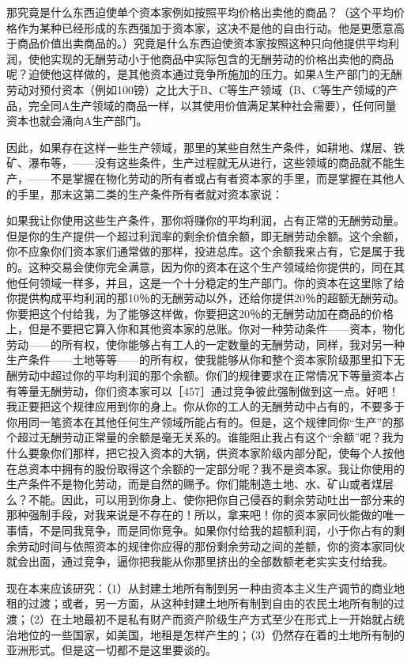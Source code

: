 那究竟是什么东西迫使单个资本家例如按照平均价格出卖他的商品？（这个平均价格作为某种已经形成的东西强加于资本家，这决不是他的自由行动。他是更愿意高于商品价值出卖商品的。）究竟是什么东西迫使资本家按照这种只向他提供平均利润，使他实现的无酬劳动小于他商品中实际包含的无酬劳动的价格出卖他的商品呢？迫使他这样做的，是其他资本通过竞争所施加的压力。如果A生产部门的无酬劳动对预付资本（例如100镑）之比大于B、C等生产领域（B、C等生产领域的产品，完全同A生产领域的商品一样，以其使用价值满足某种社会需要），任何同量资本也就会涌向A生产部门。

因此，如果存在这样一些生产领域，那里的某些自然生产条件，如耕地、煤层、铁矿、瀑布等，——没有这些条件，生产过程就无从进行，这些领域的商品就不能生产，——不是掌握在物化劳动的所有者或占有者资本家的手里，而是掌握在其他人的手里，那末这第二类的生产条件所有者就对资本家说：

如果我让你使用这些生产条件，那你将赚你的平均利润，占有正常的无酬劳动量。但是你的生产提供一个超过利润率的剩余价值余额，即无酬劳动余额。这个余额，你不应象你们资本家们通常做的那样，投进总库。这个余额我来占有，它是属于我的。这种交易会使你完全满意，因为你的资本在这个生产领域给你提供的，同在其他任何领域一样多，并且，这是一个十分稳定的生产部门。你的资本在这里除了给你提供构成平均利润的那10％的无酬劳动以外，还给你提供20％的超额无酬劳动。你要把这个付给我，为了能够这样做，你要把这20％的无酬劳动加在商品的价格上，但是不要把它算入你和其他资本家的总账。你对一种劳动条件——资本，物化劳动——的所有权，使你能够占有工人的一定数量的无酬劳动，同样，我对另一种生产条件——土地等等——的所有权，使我能够从你和整个资本家阶级那里扣下无酬劳动中超过你的平均利润的那个余额。你们的规律要求在正常情况下等量资本占有等量无酬劳动，你们资本家可以［457］通过竞争彼此强制做到这一点。好吧！我正要把这个规律应用到你的身上。你从你的工人的无酬劳动中占有的，不要多于你用同一笔资本在其他任何生产领域所能占有的。但是，这个规律同你“生产”的那个超过无酬劳动正常量的余额是毫无关系的。谁能阻止我占有这个“余额”呢？我为什么要象你们那样，把它投入资本的大锅，供资本家阶级内部分配，使每个人按他在总资本中拥有的股份取得这个余额的一定部分呢？我不是资本家。我让你使用的生产条件不是物化劳动，而是自然的赐予。你们能制造土地、水、矿山或者煤层么？不能。因此，可以用到你身上、使你把你自己侵吞的剩余劳动吐出一部分来的那种强制手段，对我来说是不存在的！所以，拿来吧！你的资本家同伙能做的唯一事情，不是同我竞争，而是同你竞争。如果你付给我的超额利润，小于你占有的剩余劳动时间与依照资本的规律你应得的那份剩余劳动之间的差额，你的资本家同伙就会出面，通过竞争，逼你把我能从你那里挤出的全部数额老老实实支付给我。

现在本来应该研究：（1）从封建土地所有制到另一种由资本主义生产调节的商业地租的过渡；或者，另一方面，从这种封建土地所有制到自由的农民土地所有制的过渡；（2）在土地最初不是私有财产而资产阶级生产方式至少在形式上一开始就占统治地位的一些国家，如美国，地租是怎样产生的；（3）仍然存在着的土地所有制的亚洲形式。但是这一切都不是这里要谈的。

